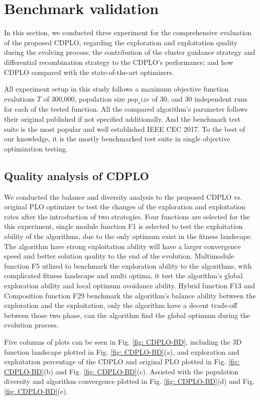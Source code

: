 \documentclass[review]{elsarticle}
\begin{document}
\section{Benchmark validation}
In this section, we conducted three experiment for the comprehensive evaluation of the proposed CDPLO, regarding the exploration and exploitation quality during the evolving process; the contribution of the cluster guidance strategy and differential recombination strategy to the CDPLO's performance; and how CDPLO compared with the state-of-the-art optimizers.

All experiment setup in this study follows a maximum objective function evalutions $T$ of 300,000, population size $pop_size$ of 30, and 30 independent runs for each of the tested function. All the compared algorithm's parameter follows their original published if not specified additionally. And the benchmark test suite is the most popular and well established IEEE CEC 2017. To the best of our knowledge, it is the mostly benchmarked test suite in single objective optimization testing.

\subsection{Quality analysis of CDPLO}
We conducted the balance and diversity analysis to the proposed CDPLO vs. original PLO optimizer to test the changes of the exploration and exploitation rates after the introduction of two strategies. Four functions are selected for the this experiment, single module function F1 is selected to test the exploitation ability of the algorithms, due to the only optimum exist in the fitness landscape. The algorithm have strong exploitation ability will have a larger convergence speed and better solution qaulity to the end of the evolution. Multimodule function F5 utlized to benchmark the exploration ability to the algorithms, with complicated fitness landscape and multi optima, it test the algorithm's global exploration ability and local optimum avoidance ability. Hybrid function F13 and Composition function F29 benchmark the algorithm's balance ability between the exploration and the exploitation, only the algorithm have a decent trade-off between those two phase, can the algorithm find the global optimum during the evolution process.

Five columns of plots can be seen in Fig. \ref{fig: CDPLO-BD}, including the 3D function landscape plotted in Fig. \ref{fig: CDPLO-BD}(a), and exploration and exploitation percentage of the CDPLO and original PLO plotted in Fig. \ref{fig: CDPLO-BD}(b) and Fig. \ref{fig: CDPLO-BD}(c). Assisted with the population diversity and algorithm convergence plotted in Fig. \ref{fig: CDPLO-BD}(d) and Fig. \ref{fig: CDPLO-BD}(e).
\end{document}
